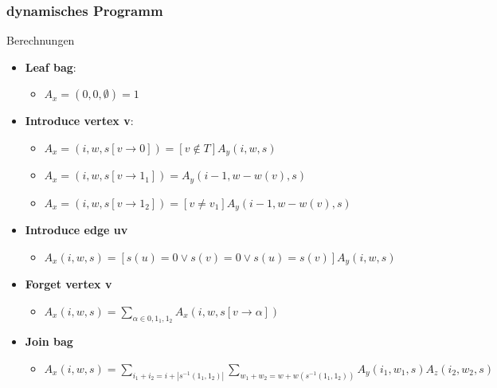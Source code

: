 \documentclass{beamer}
\begin{document}

\begin{frame}
\frametitle{dynamisches Programm}
\begin{block}{Berechnungen}
\begin{itemize}
\item \textbf{Leaf bag}:
\begin{itemize}
\item $A_x=(0,0,\emptyset) = 1$
\end{itemize}
\item \textbf{Introduce vertex v}:
\begin{itemize}
\item $A_x=(i,w,s[v\rightarrow 0]) = [v \notin T]A_y(i,w,s)$
\item $A_x=(i,w,s[v\rightarrow 1_1]) = A_y(i-1,w-w(v),s)$
\item $A_x=(i,w,s[v\rightarrow 1_2]) =[v \neq v_1] A_y(i-1,w-w(v),s)$
\end{itemize}
\item \textbf{Introduce edge uv}
\begin{itemize}
\item $A_x(i,w,s) = [s(u) = 0 \vee s(v) = 0 \vee s(u) = s(v)]A_y(i,w,s)$
\end{itemize}
\item \textbf{Forget vertex v}
\begin{itemize}
\item $A_x(i,w,s) = \sum\limits_{\alpha \in {0,1_1,1_2}} A_x(i,w,s[v \rightarrow \alpha]) $
\end{itemize}
\item \textbf{Join bag}
\begin{itemize}
\item $A_x(i,w,s) = \sum\limits_{i_1+i_2=i+|s^{-1}({1_1,1_2})|} \sum\limits_{w_1+w_2=w+w(s^{-1}({1_1,1_2}))} A_y(i_1,w_1,s)A_z(i_2,w_2,s) $
\end{itemize}
\end{itemize}
\end{block}
\end{frame}

\end{document}
